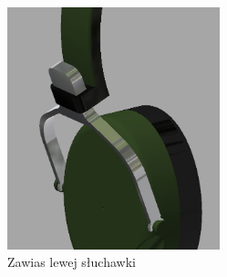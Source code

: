 \begin{figure}[H]
	\centering
	\includegraphics[height=7cm]{zdjecia/model/hinge.png}
	\caption{\label{pic:hinge}Zawias lewej słuchawki}
\end{figure}